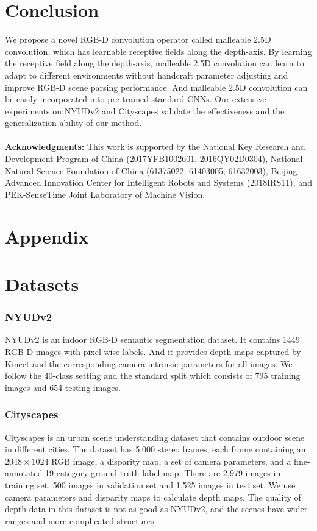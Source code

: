 \documentclass[runningheads]{llncs}
\begin{document}
\section{Conclusion}
We propose a novel RGB-D convolution operator called malleable 2.5D convolution, which has learnable receptive fields along the depth-axis.
By learning the receptive field along the depth-axis, malleable 2.5D convolution can learn to adapt to different environments without handcraft parameter adjusting and improve RGB-D scene parsing performance.
And malleable 2.5D convolution can be easily incorporated into pre-trained standard CNNs.
Our extensive experiments on NYUDv2 and Cityscapes validate the effectiveness and the generalization ability of our method.
\\
\\
\noindent \textbf{Acknowledgments:} This work is supported by the National Key Research and Development Program of China (2017YFB1002601, 2016QY02D0304), National Natural Science Foundation of China (61375022, 61403005, 61632003), Beijing Advanced Innovation Center for Intelligent Robots and Systems (2018IRS11), and PEK-SenseTime Joint Laboratory of Machine Vision.




\clearpage
\section*{Appendix}
\setcounter{section}{0}

\section{Datasets}
\subsubsection{NYUDv2}
NYUDv2\cite{NYUDv2} is an indoor RGB-D semantic segmentation dataset.
It contains 1449 RGB-D images with pixel-wise labels.
And it provides depth maps captured by Kinect and the corresponding camera intrinsic parameters for all images.
We follow the 40-class setting and the standard split which consists of 795 training images and 654 testing images.
\subsubsection{Cityscapes}
Cityscapes\cite{Cityscapes} is an urban scene understanding dataset that contains outdoor scene in different cities.
The dataset has 5,000 stereo frames,
each frame containing an $2048\times1024$ RGB image, a disparity map, a set of camera parameters, and a fine-annotated 19-category ground truth label map.
There are 2,979 images in training set, 500 images in validation set and 1,525 images in test set.
We use camera parameters and disparity maps to calculate depth maps.
The quality of depth data in this dataset is not as good as NYUDv2, and the scenes have wider ranges and more complicated structures.
\end{document}
